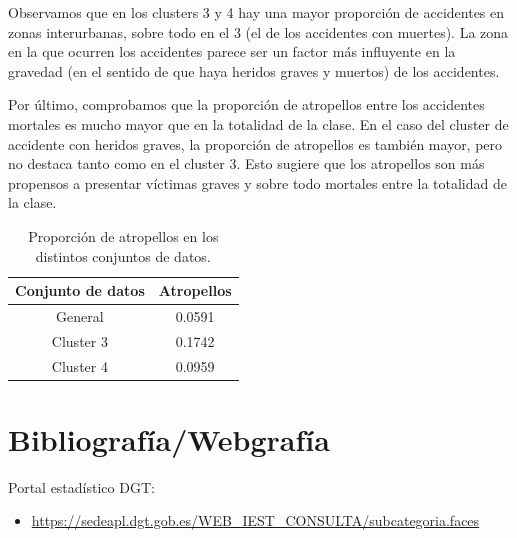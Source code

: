 \documentclass[oneside]{book}
\begin{document}
Observamos que en los clusters 3 y 4 hay una mayor proporción de
accidentes en zonas interurbanas, sobre todo en el 3 (el de los
accidentes con muertes). La zona en la que ocurren los accidentes
parece ser un factor más influyente en la gravedad (en el sentido de
que haya heridos graves y muertos) de los accidentes.

Por último, comprobamos que la proporción de atropellos entre los
accidentes mortales es mucho mayor que en la totalidad de la clase. En
el caso del cluster de accidente con heridos graves, la proporción de
atropellos es también mayor, pero no destaca tanto como en el cluster
3. Esto sugiere que los atropellos son más propensos a presentar
víctimas graves y sobre todo mortales entre la totalidad de la clase.

\begin{table}[H]
  \centering
\begin{tabular}{|c|c|}
  \hline
  Conjunto de datos & Atropellos \\ \hline
  General & 0.0591 \\ \hline
  Cluster 3 & 0.1742 \\ \hline
  Cluster 4 & 0.0959 \\ \hline
\end{tabular}
\caption{Proporción de atropellos en los distintos conjuntos de
  datos.}
\label{tab:prop-atropellos}
\end{table}

\section{Bibliografía/Webgrafía}

Portal estadístico DGT:
\begin{itemize}
\item \href{https://sedeapl.dgt.gob.es/WEB_IEST_CONSULTA/subcategoria.faces}{https://sedeapl.dgt.gob.es/WEB\_IEST\_CONSULTA/subcategoria.faces}
\end{itemize}
\end{document}
